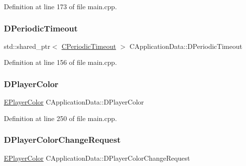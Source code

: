 Definition at line 173 of file main.\+cpp.

\hypertarget{classCApplicationData_a0265cb7aba9f099faed2a1c8ee588d33}{}\label{classCApplicationData_a0265cb7aba9f099faed2a1c8ee588d33} 
\subsubsection{\texorpdfstring{D\+Periodic\+Timeout}{DPeriodicTimeout}}
{\footnotesize\ttfamily std\+::shared\+\_\+ptr$<$ \hyperlink{classCPeriodicTimeout}{C\+Periodic\+Timeout} $>$ C\+Application\+Data\+::\+D\+Periodic\+Timeout\hspace{0.3cm}{\ttfamily [protected]}}



Definition at line 156 of file main.\+cpp.

\hypertarget{classCApplicationData_a53550939b20cba70570f113e4d1c5d02}{}\label{classCApplicationData_a53550939b20cba70570f113e4d1c5d02} 
\subsubsection{\texorpdfstring{D\+Player\+Color}{DPlayerColor}}
{\footnotesize\ttfamily \hyperlink{GameDataTypes_8h_aafb0ca75933357ff28a6d7efbdd7602f}{E\+Player\+Color} C\+Application\+Data\+::\+D\+Player\+Color\hspace{0.3cm}{\ttfamily [protected]}}



Definition at line 250 of file main.\+cpp.

\hypertarget{classCApplicationData_ae72fd0906b911705aafb9df8cf610f97}{}\label{classCApplicationData_ae72fd0906b911705aafb9df8cf610f97} 
\subsubsection{\texorpdfstring{D\+Player\+Color\+Change\+Request}{DPlayerColorChangeRequest}}
{\footnotesize\ttfamily \hyperlink{GameDataTypes_8h_aafb0ca75933357ff28a6d7efbdd7602f}{E\+Player\+Color} C\+Application\+Data\+::\+D\+Player\+Color\+Change\+Request\hspace{0.3cm}{\ttfamily [protected]}}



